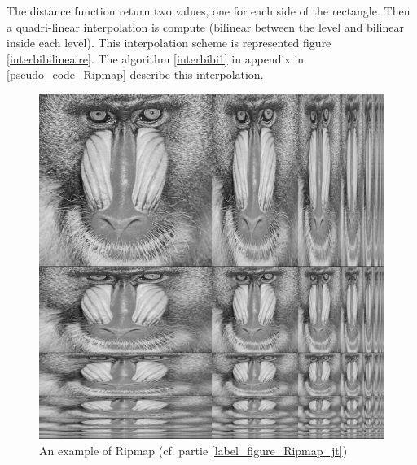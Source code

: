 The distance function return two values, one for each side of the rectangle. Then a quadri-linear interpolation is compute (bilinear between the level and bilinear inside each level). This interpolation scheme is represented figure \ref{interbibilineaire}. The algorithm \ref{interbibi1} in appendix in \ref{pseudo_code_Ripmap} describe this interpolation.








\label{label_figure_Ripmap_jt}
\begin{figure}[h!]
\centering
\includegraphics[scale=0.4]{Ripmap_real}
\caption{An example of Ripmap (cf. partie \ref{label_figure_Ripmap_jt})}
\label{Ripmap_real}
\end{figure}



